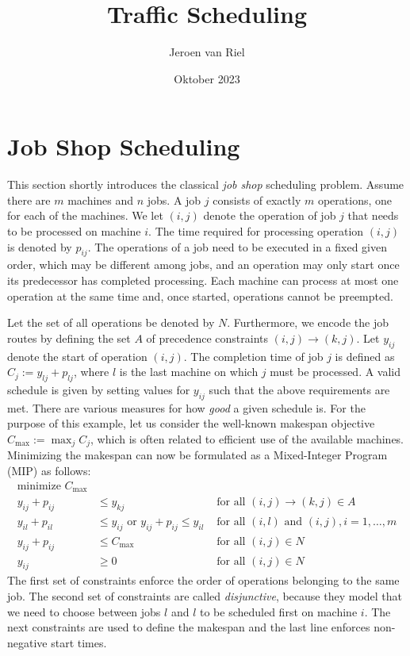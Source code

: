 \documentclass{article}
\title{Traffic Scheduling}
\author{Jeroen van Riel}
\date{Oktober 2023}
\begin{document}
\maketitle

\section{Job Shop Scheduling}

This section shortly introduces the classical \textit{job shop} scheduling
problem. Assume there are $m$ machines and $n$ jobs. A job $j$ consists of
exactly $m$ operations, one for each of the machines. We let $(i,j)$ denote the
operation of job $j$ that needs to be processed on machine $i$. The time
required for processing operation $(i,j)$ is denoted by $p_{ij}$. The operations
of a job need to be executed in a fixed given order, which may be different
among jobs, and an operation may only start once its predecessor has completed
processing. Each machine can process at most one operation at the same time and,
once started, operations cannot be preempted.

Let the set of all operations be denoted by $N$. Furthermore, we encode the job
routes by defining the set $A$ of precedence constraints
$(i,j) \xrightarrow{} (k,j)$. Let $y_{ij}$ denote the start of operation
$(i,j)$. The completion time of job $j$ is defined as
$C_{j} := y_{lj} + p_{lj}$, where $l$ is the last machine on which $j$ must be
processed. A valid schedule is given by setting values for $y_{ij}$ such that
the above requirements are met. There are various measures for how \textit{good}
a given schedule is. For the purpose of this example, let us consider the
well-known makespan objective $C_{\text{max}} := \max_{j} C_{j}$, which is often
related to efficient use of the available machines. Minimizing the makespan can
now be formulated as a Mixed-Integer Program (MIP) as follows:
%
\begin{align*}
  \text{minimize } C_{\text{max}} \\
  y_{ij} + p_{ij} &\leq y_{kj}  & \text{ for all } (i,j) \xrightarrow{} (k,j) \in A \\
  y_{il} + p_{il} &\leq  y_{ij} \text{ or } y_{ij} + p_{ij} \leq y_{il}  & \text{ for all } (i,l) \text{ and } (i,j), i =1, \dots,m \\
  y_{ij} + p_{ij} &\leq C_{\text{max}} & \text{ for all } (i,j) \in N \\
  y_{ij} &\geq 0 & \text{ for all } (i,j) \in N
\end{align*}
%
The first set of constraints enforce the order of operations belonging to the
same job. The second set of constraints are called \textit{disjunctive}, because
they model that we need to choose between jobs $l$ and $l$ to be scheduled first
on machine $i$. The next constraints are used to define the makespan and the
last line enforces non-negative start times.
\end{document}
